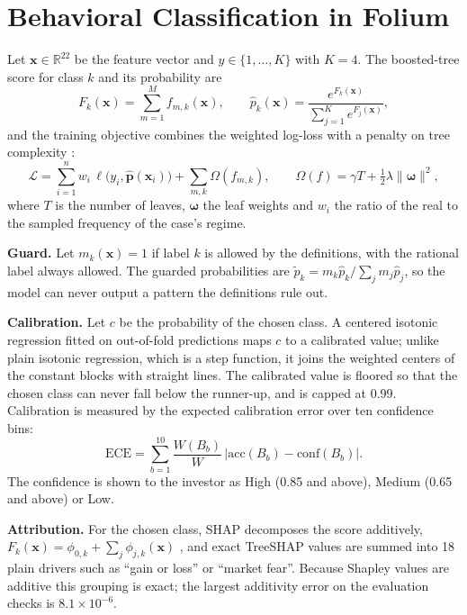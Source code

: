 \section{Behavioral Classification in Folium}
Let $\mathbf{x} \in \mathbb{R}^{22}$ be the feature vector and $y \in \{1,\dots,K\}$ with $K = 4$. The boosted-tree score for class $k$ and its probability are
\begin{equation}
F_k(\mathbf{x}) = \sum_{m=1}^{M} f_{m,k}(\mathbf{x}), \qquad \hat{p}_k(\mathbf{x}) = \frac{e^{F_k(\mathbf{x})}}{\sum_{j=1}^{K} e^{F_j(\mathbf{x})}} ,
\end{equation}
and the training objective combines the weighted log-loss with a penalty on tree complexity \cite{b5,b26}:
\begin{equation}
\mathcal{L} = \sum_{i=1}^{n} w_i\,\ell\big(y_i, \hat{\mathbf{p}}(\mathbf{x}_i)\big) + \sum_{m,k} \Omega(f_{m,k}), \qquad \Omega(f) = \gamma T + \tfrac{1}{2}\lambda \lVert \boldsymbol{\omega} \rVert^2 ,
\end{equation}
where $T$ is the number of leaves, $\boldsymbol{\omega}$ the leaf weights and $w_i$ the ratio of the real to the sampled frequency of the case's regime.

\textbf{Guard.} Let $m_k(\mathbf{x}) = 1$ if label $k$ is allowed by the definitions, with the rational label always allowed. The guarded probabilities are $\tilde{p}_k = m_k\hat{p}_k / \sum_j m_j \hat{p}_j$, so the model can never output a pattern the definitions rule out.

\textbf{Calibration.} Let $c$ be the probability of the chosen class. A centered isotonic regression \cite{b47} fitted on out-of-fold predictions maps $c$ to a calibrated value; unlike plain isotonic regression, which is a step function, it joins the weighted centers of the constant blocks with straight lines. The calibrated value is floored so that the chosen class can never fall below the runner-up, and is capped at 0.99. Calibration is measured by the expected calibration error over ten confidence bins:
\begin{equation}
\mathrm{ECE} = \sum_{b=1}^{10} \frac{W(B_b)}{W}\,\big|\mathrm{acc}(B_b) - \mathrm{conf}(B_b)\big| .
\end{equation}
The confidence is shown to the investor as High (0.85 and above), Medium (0.65 and above) or Low.

\textbf{Attribution.} For the chosen class, SHAP decomposes the score additively, $F_k(\mathbf{x}) = \phi_{0,k} + \sum_{j} \phi_{j,k}(\mathbf{x})$ \cite{b7}, and exact TreeSHAP values \cite{b35} are summed into 18 plain drivers such as ``gain or loss'' or ``market fear''. Because Shapley values are additive this grouping is exact; the largest additivity error on the evaluation checks is $8.1\times10^{-6}$.

